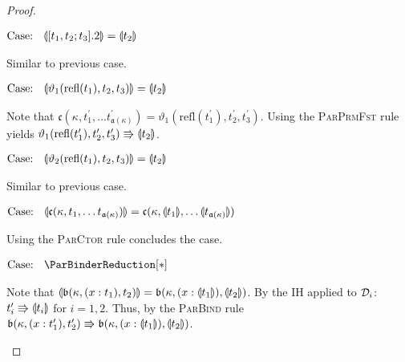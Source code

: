 \begin{proof}
\begin{proofcase}
        $\text{Case: }\begin{array}{c} \llparenthesis {[t_1, t_2; t_3].2} \rrparenthesis = \llparenthesis {t_2} \rrparenthesis \end{array}$
        \begin{proofcase}
            Similar to previous case.
        \end{proofcase}

        $\text{Case: }\begin{array}{c} \llparenthesis {\vartheta_1(\text{refl}(t_1), t_2, t_3)} \rrparenthesis = \llparenthesis {t_2} \rrparenthesis \end{array}$
        \begin{proofcase}
            Note that $\mathfrak{c}(\kappa, t_1^\prime, \ldots t^\prime_{\mathfrak{a}(\kappa)}) = \vartheta_1(\text{refl}(t_1^\prime), t_2^\prime, t_3^\prime)$.
            Using the \textsc{ParPrmFst} rule yields $\vartheta_1(\text{refl}(t_1^\prime), t_2^\prime, t_3^\prime) \Rrightarrow \llparenthesis {t_2} \rrparenthesis$.
        \end{proofcase}

        $\text{Case: }\begin{array}{c} \llparenthesis {\vartheta_2(\text{refl}(t_1), t_2, t_3)} \rrparenthesis = \llparenthesis {t_2} \rrparenthesis \end{array}$
        \begin{proofcase}
            Similar to previous case.
        \end{proofcase}

        $\text{Case: }\begin{array}{c} \llparenthesis {\mathfrak{c}(\kappa, t_1, \ldots t_{\mathfrak{a}(\kappa)})} \rrparenthesis = \mathfrak{c}(\kappa, \llparenthesis {t_1} \rrparenthesis, \ldots \llparenthesis {t_{\mathfrak{a}(\kappa)}} \rrparenthesis) \end{array}$
        \begin{proofcase}
            Using the \textsc{ParCtor} rule concludes the case.
        \end{proofcase}
    \end{proofcase}

    $\text{Case: }\begin{array}{c} \ParBinderReduction[*] \end{array}$
    \begin{proofcase}
        Note that $\llparenthesis {\mathfrak{b}(\kappa, (x : t_1), t_2)} \rrparenthesis = \mathfrak{b}(\kappa, (x : \llparenthesis {t_1} \rrparenthesis), \llparenthesis {t_2} \rrparenthesis)$.
        By the IH applied to $\mathcal{D}_{i}$: $t_i^\prime \Rrightarrow \llparenthesis {t_i} \rrparenthesis$ for $i = 1, 2$.
        Thus, by the \textsc{ParBind} rule $\mathfrak{b}(\kappa, (x : t_1^\prime), t_2^\prime) \Rrightarrow \mathfrak{b}(\kappa, (x : \llparenthesis {t_1} \rrparenthesis), \llparenthesis {t_2} \rrparenthesis)$.
    \end{proofcase}


\end{proof}
